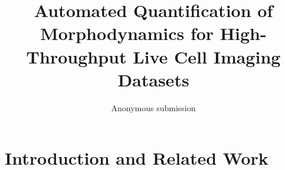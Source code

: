 \documentclass{llncs}
\begin{document}
%
\frontmatter          %
%
\pagestyle{empty}  %
%
\mainmatter              %
%
\title{Automated Quantification of Morphodynamics
for High-Throughput Live Cell Imaging Datasets}

%
\author{Anonymous submission 
}


\authorrunning{-}   %
%
\tocauthor{-}

\newcommand{\comment}[1]{}
\maketitle              %

\begin{abstract}

\end{abstract}

\section{Introduction and Related Work}
\label{sec:intro}


%
\end{document}
